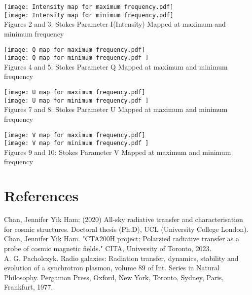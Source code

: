 \documentclass[apj]{emulateapj}
\begin{document}
\begin{center}
\texttt{[image: Intensity map for maximum frequency.pdf]}\\
\texttt{[image: Intensity map for minimum frequency.pdf]}\\
\label{plot 1}
Figures 2 and 3: Stokes Parameter I(Intensity) Mapped at maximum and minimum frequency

\texttt{[image: Q map for maximum frequency.pdf]}\\
\texttt{[image: Q map for minimum frequency.pdf ]}\\
\label{plot 1}
Figures 4 and 5: Stokes Parameter Q Mapped at maximum and minimum frequency

\texttt{[image: U map for maximum frequency.pdf]}\\
\texttt{[image: U map for minimum frequency.pdf ]}\\
\label{plot 1}
Figures 7 and 8: Stokes Parameter U Mapped at maximum and minimum frequency

\texttt{[image: V map for maximum frequency.pdf]}\\
\texttt{[image: V map for minimum frequency.pdf ]}\\
\label{plot 1}
Figures 9 and 10: Stokes Parameter V Mapped at maximum and minimum frequency
\end{center}

\section{References}
Chan, Jennifer Yik Ham; (2020) All-sky radiative transfer and characterisation for cosmic structures. Doctoral thesis (Ph.D), UCL (University College London). \\

Chan, Jennifer Yik Ham. "CTA200H project: Polarzied radiative transfer as a probe of cosmic magnetic fields." CITA, University of Toronto, 2023.
\\

A. G. Pacholczyk. Radio galaxies: Radiation transfer, dynamics, stability and evolution of a synchrotron plasmon, volume 89 of Int. Series in Natural Philosophy. Pergamon Press, Oxford, New York, Toronto, Sydney, Paris, Frankfurt, 1977.




\end{document}
